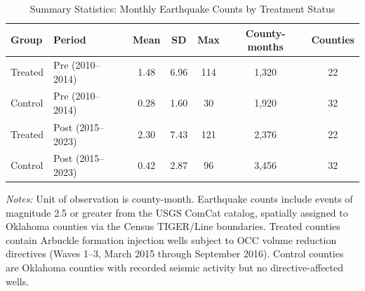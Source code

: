\begin{table}[htbp]
\centering
\caption{Summary Statistics: Monthly Earthquake Counts by Treatment Status}
\label{tab:summary}
\begin{threeparttable}
\begin{tabular}{llccccc}
\toprule
Group & Period & Mean & SD & Max & County-months & Counties \\
\midrule
Treated & Pre (2010--2014) & 1.48 & 6.96 & 114 & 1,320 & 22 \\
Control & Pre (2010--2014) & 0.28 & 1.60 & 30 & 1,920 & 32 \\
\midrule
Treated & Post (2015--2023) & 2.30 & 7.43 & 121 & 2,376 & 22 \\
Control & Post (2015--2023) & 0.42 & 2.87 & 96 & 3,456 & 32 \\
\bottomrule
\end{tabular}
\begin{tablenotes}[flushleft]
\small
\item \textit{Notes:} Unit of observation is county-month. Earthquake counts include events of magnitude 2.5 or greater from the USGS ComCat catalog, spatially assigned to Oklahoma counties via the Census TIGER/Line boundaries. Treated counties contain Arbuckle formation injection wells subject to OCC volume reduction directives (Waves 1--3, March 2015 through September 2016). Control counties are Oklahoma counties with recorded seismic activity but no directive-affected wells.
\end{tablenotes}
\end{threeparttable}
\end{table}

